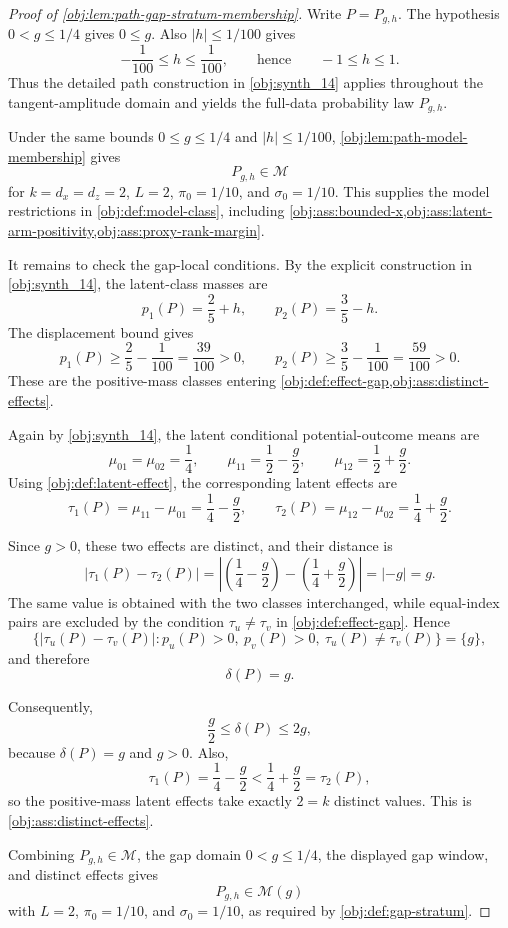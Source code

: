 \begin{proof}[Proof of \cref{obj:lem:path-gap-stratum-membership}]
Write \(P=P_{g,h}\).  The hypothesis \(0<g\le 1/4\) gives \(0\le g\).  Also \(|h|\le 1/100\) gives
\[
-\frac1{100}\le h\le \frac1{100},
\qquad\text{hence}\qquad
-1\le h\le 1 .
\]
Thus the detailed path construction in \cref{obj:synth_14} applies throughout the tangent-amplitude domain and yields the full-data probability law \(P_{g,h}\). %

Under the same bounds \(0\le g\le 1/4\) and \(|h|\le1/100\), \cref{obj:lem:path-model-membership} gives
\[
P_{g,h}\in\mathcal M
\]
for \(k=d_x=d_z=2\), \(L=2\), \(\pi_0=1/10\), and \(\sigma_0=1/10\).  This supplies the model restrictions in \cref{obj:def:model-class}, including \cref{obj:ass:bounded-x,obj:ass:latent-arm-positivity,obj:ass:proxy-rank-margin}. %

It remains to check the gap-local conditions.  By the explicit construction in \cref{obj:synth_14}, the latent-class masses are
\[
p_1(P)=\frac25+h,
\qquad
p_2(P)=\frac35-h .
\]
The displacement bound gives
\[
p_1(P)\ge \frac25-\frac1{100}=\frac{39}{100}>0,
\qquad
p_2(P)\ge \frac35-\frac1{100}=\frac{59}{100}>0 .
\]
These are the positive-mass classes entering \cref{obj:def:effect-gap,obj:ass:distinct-effects}. %

Again by \cref{obj:synth_14}, the latent conditional potential-outcome means are
\[
\mu_{01}=\mu_{02}=\frac14,
\qquad
\mu_{11}=\frac12-\frac g2,
\qquad
\mu_{12}=\frac12+\frac g2 .
\]
Using \cref{obj:def:latent-effect}, the corresponding latent effects are
\[
\tau_1(P)=\mu_{11}-\mu_{01}
=\frac14-\frac g2,
\qquad
\tau_2(P)=\mu_{12}-\mu_{02}
=\frac14+\frac g2 .
\]

Since \(g>0\), these two effects are distinct, and their distance is
\[
|\tau_1(P)-\tau_2(P)|
=
\left|
\left(\frac14-\frac g2\right)
-
\left(\frac14+\frac g2\right)
\right|
=
|-g|
=
g .
\]
The same value is obtained with the two classes interchanged, while equal-index pairs are excluded by the condition \(\tau_u\ne\tau_v\) in \cref{obj:def:effect-gap}.  Hence
\[
\bigl\{|\tau_u(P)-\tau_v(P)|:
p_u(P)>0,\ p_v(P)>0,\ \tau_u(P)\ne\tau_v(P)\bigr\}
=
\{g\},
\]
and therefore
\[
\delta(P)=g .
\]

Consequently,
\[
\frac g2\le \delta(P)\le 2g,
\]
because \(\delta(P)=g\) and \(g>0\).  Also,
\[
\tau_1(P)=\frac14-\frac g2
<
\frac14+\frac g2
=\tau_2(P),
\]
so the positive-mass latent effects take exactly \(2=k\) distinct values.  This is \cref{obj:ass:distinct-effects}. %

Combining \(P_{g,h}\in\mathcal M\), the gap domain \(0<g\le1/4\), the displayed gap window, and distinct effects gives
\[
P_{g,h}\in\mathcal M(g)
\]
with \(L=2\), \(\pi_0=1/10\), and \(\sigma_0=1/10\), as required by \cref{obj:def:gap-stratum}. %
\end{proof}
